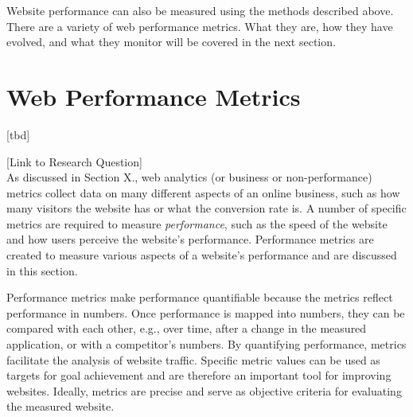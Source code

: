 Website performance can also be measured using the methods described above.
There are a variety of web performance metrics.
What they are, how they have evolved, and what they monitor will be covered in the next section.





\section{Web Performance Metrics} %
\label{section:web_performance_metrics}

[tbd]

[Link to Research Question] \\




As discussed in Section X., web analytics (or business or non-performance) metrics collect data on many different aspects of an online business, such as how many visitors the website has or what the conversion rate is.
A number of specific metrics are required to measure \textit{performance}, such as the speed of the website and how users perceive the website's performance.
Performance metrics are created to measure various aspects of a website's performance and are discussed in this section.



Performance metrics make performance quantifiable because the metrics reflect performance in numbers.
Once performance is mapped into numbers, they can be compared with each other, e.g., over time, after a change in the measured application, or with a competitor's numbers. %
By quantifying performance, metrics facilitate the analysis of website traffic.
Specific metric values can be used as targets for goal achievement and are therefore an important tool for improving websites. %
Ideally, metrics are precise and serve as objective criteria for evaluating the measured website. %




